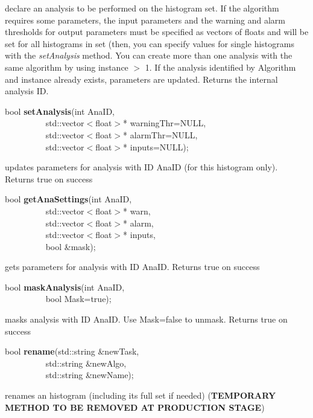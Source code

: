  declare an analysis to be performed on the histogram set. If the algorithm
 requires some parameters, the input parameters and the warning and alarm 
 thresholds for output parameters must be
 specified as vectors of floats and will be set for all histograms in
 set (then, you can specify values for single histograms with the {\it
 setAnalysis} method. 
 You can create more than one analysis
 with the same algorithm by using instance $>$ 1. If the analysis
 identified by Algorithm and instance already exists, parameters are
 updated. Returns the internal analysis ID.


\item    bool {\bf setAnalysis}(int AnaID,\\\mbox{}~~~~~~~~~ 
                   std::vector$<$float$>$* warningThr=NULL,\\\mbox{}~~~~~~~~~ 
                   std::vector$<$float$>$* alarmThr=NULL,\\\mbox{}~~~~~~~~~ 
                   std::vector$<$float$>$* inputs=NULL);

 updates parameters for analysis with ID AnaID (for this histogram only). Returns true on success


\item    bool {\bf getAnaSettings}(int AnaID,\\\mbox{}~~~~~~~~~
                      std::vector$<$float$>$* warn,\\\mbox{}~~~~~~~~~ 
                      std::vector$<$float$>$* alarm,\\\mbox{}~~~~~~~~~
                      std::vector$<$float$>$* inputs,\\\mbox{}~~~~~~~~~
                      bool \&mask);

 gets parameters for analysis with ID AnaID. Returns true on success


\item    bool {\bf maskAnalysis}(int AnaID,\\\mbox{}~~~~~~~~~
                    bool Mask=true);

 masks analysis with ID AnaID. Use Mask=false to unmask. Returns true on success


\item    bool {\bf rename}(std::string \&newTask,\\\mbox{}~~~~~~~~~
              std::string \&newAlgo,\\\mbox{}~~~~~~~~~
              std::string \&newName);

 renames an histogram (including its full set if needed) 
 ({\bf TEMPORARY METHOD TO BE REMOVED AT PRODUCTION STAGE})


